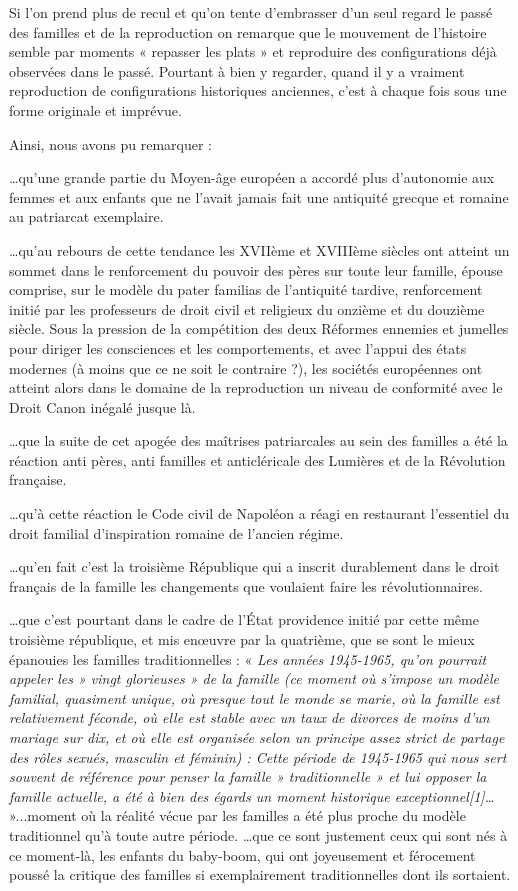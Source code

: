 
 Si l'on prend plus de recul et qu'on tente d'embrasser d'un seul regard le passé des familles et de la reproduction on remarque que le mouvement de l'histoire semble par moments « repasser les plats » et reproduire des configurations déjà observées dans le passé. Pourtant à bien y regarder, quand il y a vraiment reproduction de configurations historiques anciennes, c'est à chaque fois sous une forme originale et imprévue. 
 
 Ainsi, nous avons pu remarquer : 
 
 …qu'une grande partie du Moyen-âge européen a accordé plus d'autonomie aux femmes et aux enfants que ne l'avait jamais fait une antiquité grecque et romaine au patriarcat exemplaire. 
 
 …qu'au rebours de cette tendance les XVIIème et XVIIIème siècles ont atteint un sommet dans le renforcement du pouvoir des pères sur toute leur famille, épouse comprise, sur le modèle du pater familias de l'antiquité tardive, renforcement initié par les professeurs de droit civil et religieux du onzième et du douzième siècle. Sous la pression de la compétition des deux Réformes ennemies et jumelles pour diriger les consciences et les comportements, et avec l'appui des états modernes (à moins que ce ne soit le contraire ?), les sociétés européennes ont atteint alors dans le domaine de la reproduction un niveau de conformité avec le Droit Canon inégalé jusque là. 
 
 …que la suite de cet apogée des maîtrises patriarcales au sein des familles a été la réaction anti pères, anti familles et anticléricale des Lumières et de la Révolution française. 
 
 …qu'à cette réaction le Code civil de Napoléon a réagi en restaurant l'essentiel du droit familial d'inspiration romaine de l'ancien régime. 
 
 …qu'en fait c'est la troisième République qui a inscrit durablement dans le droit français de la famille les changements que voulaient faire les révolutionnaires. 
 
 …que c'est pourtant dans le cadre de l'État providence initié par cette même troisième république, et mis enœuvre par la quatrième, que se sont le mieux épanouies les familles traditionnelles : « \emph{ Les années 1945-1965, qu'on pourrait appeler les » vingt glorieuses » de la famille (ce moment où s'impose un modèle familial, quasiment unique, où presque tout le monde se marie, où la famille est relativement féconde, où elle est stable avec un taux de divorces de moins d'un mariage sur dix, et où elle est organisée selon un principe assez strict de partage des rôles sexués, masculin et féminin) : Cette période de 1945-1965 qui nous sert souvent de référence pour penser la famille » traditionnelle » et lui opposer la famille actuelle, a été à bien des égards un moment historique exceptionnel[1]…} »...moment où la réalité vécue par les familles a été plus proche du modèle traditionnel qu'à toute autre période.
 …que ce sont justement ceux qui sont nés à ce moment-là, les enfants du baby-boom, qui ont joyeusement et férocement poussé la critique des familles si exemplairement traditionnelles dont ils sortaient. 
 
